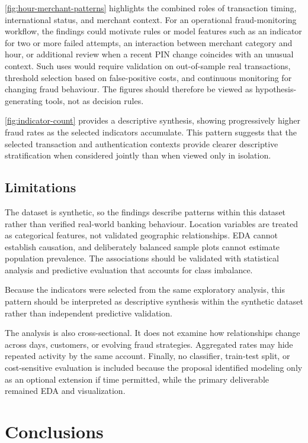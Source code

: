 \documentclass[conference,final,]{IEEEtran}
\begin{document}
\autoref{fig:hour-merchant-patterns} highlights the combined roles of
transaction timing, international status, and merchant context. For an
operational fraud-monitoring workflow, the findings could motivate rules
or model features such as an indicator for two or more failed attempts,
an interaction between merchant category and hour, or additional review
when a recent PIN change coincides with an unusual context. Such uses
would require validation on out-of-sample real transactions, threshold
selection based on false-positive costs, and continuous monitoring for
changing fraud behaviour. The figures should therefore be viewed as
hypothesis-generating tools, not as decision rules.

\autoref{fig:indicator-count} provides a descriptive synthesis, showing
progressively higher fraud rates as the selected indicators accumulate.
This pattern suggests that the selected transaction and authentication
contexts provide clearer descriptive stratification when considered
jointly than when viewed only in isolation.

\subsection{Limitations}\label{limitations}

The dataset is synthetic, so the findings describe patterns within this
dataset rather than verified real-world banking behaviour. Location
variables are treated as categorical features, not validated geographic
relationships. EDA cannot establish causation, and deliberately balanced
sample plots cannot estimate population prevalence. The associations
should be validated with statistical analysis and predictive evaluation
that accounts for class imbalance.

Because the indicators were selected from the same exploratory analysis,
this pattern should be interpreted as descriptive synthesis within the
synthetic dataset rather than independent predictive validation.

The analysis is also cross-sectional. It does not examine how
relationships change across days, customers, or evolving fraud
strategies. Aggregated rates may hide repeated activity by the same
account. Finally, no classifier, train-test split, or cost-sensitive
evaluation is included because the proposal identified modeling only as
an optional extension if time permitted, while the primary deliverable
remained EDA and visualization.

\section{Conclusions}\label{conclusions}
\end{document}
